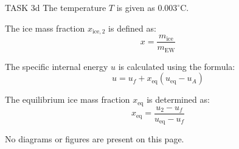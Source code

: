 TASK 3d  
The temperature \( T \) is given as \( 0.003^\circ\text{C} \).  

The ice mass fraction \( x_{\text{ice},2} \) is defined as:  
\[
x = \frac{m_{\text{ice}}}{m_{\text{EW}}}
\]  

The specific internal energy \( u \) is calculated using the formula:  
\[
u = u_f + x_{\text{eq}} (u_{\text{eq}} - u_A)
\]  

The equilibrium ice mass fraction \( x_{\text{eq}} \) is determined as:  
\[
x_{\text{eq}} = \frac{u_2 - u_f}{u_{\text{eq}} - u_f}
\]  

No diagrams or figures are present on this page.